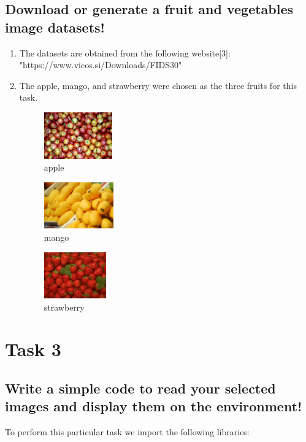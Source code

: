 \documentclass[conference]{IEEEtran}
\begin{document}
\subsection{Download or generate a fruit and vegetables image datasets!}
\begin{enumerate}
    \item The datasets are obtained from the following website[3]: \\ "https://www.vicos.si/Downloads/FIDS30"
   
\item The apple, mango, and strawberry were chosen as the three fruits for this task.

\begin{figure}[!htbp]
    \centering
    \includegraphics[height=2cm]{apple.jpg}
    \caption{apple}
    \label{fig:my_label}
\end{figure}
\begin{figure}[!htbp]
    \centering
    \includegraphics[height=2cm]{mango.jpg}
    \caption{mango}
    \label{fig:my_label}
\end{figure}
\begin{figure}[!htbp]
    \centering
    \includegraphics[height=2cm]{strawberry.jpg}
    \caption{strawberry}
    \label{fig:my_label}
\end{figure}
\end{enumerate}


\section{Task 3}
\subsection{Write a simple code to read your selected images and display them on the environment!}
To perform this particular task we import the following libraries:
\end{document}
